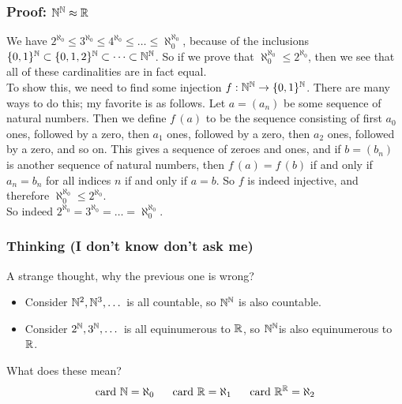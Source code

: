 \documentclass{beamer}
\begin{document}
\begin{frame}
    \frametitle{Proof: $\mathbb{N}^{\mathbb{N}} \approx \mathbb{R}$}
    \hh We have $2^{\aleph_0} \leq 3^{\aleph_0} \leq 4^{\aleph_0} \leq \dots \leq \aleph_0^{\aleph_0}$, because of the inclusions $\{0, 1\}^{\mathbb{N}} \subset \{0,1,2\}^{\mathbb{N}} \subset \dots \subset \mathbb{N}^{\mathbb{N}}$. 
    So if we prove that $\aleph_0^{\aleph_0} \leq 2^{\aleph_0}$, then we see that all of these cardinalities are in fact equal. 
    \\\vs{0.5em}
    \hh To show this, we need to find some injection $f: \mathbb{N}^{\mathbb{N}} \to \{0, 1\}^{\mathbb{N}}$. There are many ways to do this; my favorite is as follows. Let $a = (a_n)$ be some sequence of natural numbers. 
    Then we define $f\,(a)$ to be the sequence consisting of first $a_0$ ones, followed by a zero, then $a_1$ ones, followed by a zero, then $a_2$ ones, followed by a zero, and so on. 
    This gives a sequence of zeroes and ones, and if $b = (b_n)$ is another sequence of natural numbers, then $f\,(a) = f\,(b)$ if and only if $a_n =b_n$ for all indices $n$ if and only if $a = b$. So $f$ is indeed injective, 
    and therefore $\aleph_0^{\aleph_0} \leq 2^{\aleph_0}$.
    \\\vs{0.5em}
    \hh So indeed $2^{\aleph_0} = 3^{\aleph_0} = \dots = \aleph_0^{\aleph_0}$. 
\end{frame}
\begin{frame}
    \frametitle{Thinking (I don't know don't ask me)}
    A strange thought, why the previous one is wrong?
    \begin{itemize}
        \item Consider $\mathbb{N}^2,\mathbb{N}^3,\dots$ is all countable, so $\mathbb{N}^{\mathbb{N}}$ is also countable.
        \item Consider $2^{\mathbb{N}},3^{\mathbb{N}},\dots$ is all equinumerous to $\mathbb{R}$, so $\mathbb{N}^{\mathbb{N}}$is also equinumerous to $\mathbb{R}$.
    \end{itemize}
    \vv
    What does these mean?\\
    $$\text{card } \mathbb{N} = {\aleph}_{0} ~~~~~\text{card }\mathbb{R} = {\aleph}_{1} ~~~~~ \text{card } \mathbb{R}^{\mathbb{R}} = \aleph_2$$

\end{frame}
\end{document}
